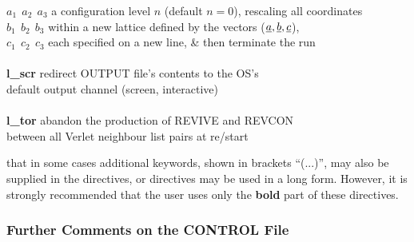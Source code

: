 \begin{tabbing}
\> \phantom{xxxxxxxx} $a_{1}~~a_{2}~~a_{3}$     \> a configuration level $n$ (default $n=0$), rescaling all coordinates \\
\> \phantom{xxxxxxxx} $b_{1}~~b_{2}~~b_{3}$     \> within a new lattice defined by the vectors ($\mbox{$\underline{a}$},\mbox{$\underline{b}$},\mbox{$\underline{c}$}$), \\
\> \phantom{xxxxxxxx} $c_{1}~~c_{2}~~c_{3}$     \> each specified on a new line, \& then terminate the run \\
\>                                              \> \\
\> {\bf l\_scr}                                 \> redirect OUTPUT file's contents to the OS's \\
\>                                              \> default output channel (screen, interactive) \\
\>                                              \> \\
\> {\bf l\_tor}                                 \> abandon the production of REVIVE and REVCON \\
\>                                              \> between all Verlet neighbour list pairs at re/start
\end{tabbing}

 that in some cases additional keywords, shown in
brackets ``(...)'', may also be supplied in the directives, or
directives may be used in a long form.  However, it is strongly
recommended that the user uses only the {\bf bold} part of these
directives.

\begin{table}[htbp]
\end{table}

\subsubsection{Further Comments on the CONTROL File}

